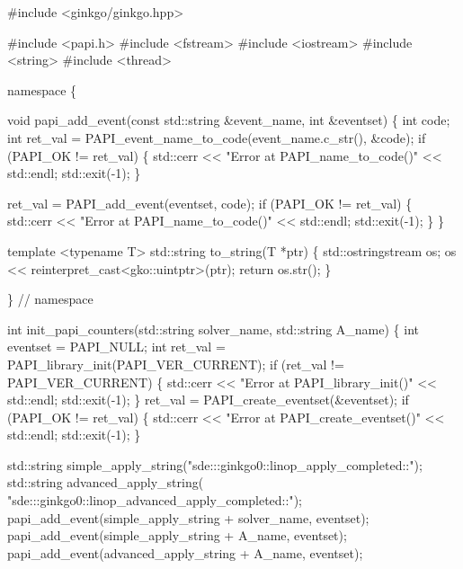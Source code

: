\begin{DoxyCodeInclude}
\textcolor{preprocessor}{#include <ginkgo/ginkgo.hpp>}


\textcolor{preprocessor}{#include <papi.h>}
\textcolor{preprocessor}{#include <fstream>}
\textcolor{preprocessor}{#include <iostream>}
\textcolor{preprocessor}{#include <string>}
\textcolor{preprocessor}{#include <thread>}


\textcolor{keyword}{namespace }\{


\textcolor{keywordtype}{void} papi\_add\_event(\textcolor{keyword}{const} std::string &event\_name, \textcolor{keywordtype}{int} &eventset)
\{
    \textcolor{keywordtype}{int} code;
    \textcolor{keywordtype}{int} ret\_val = PAPI\_event\_name\_to\_code(event\_name.c\_str(), &code);
    \textcolor{keywordflow}{if} (PAPI\_OK != ret\_val) \{
        std::cerr << \textcolor{stringliteral}{"Error at PAPI\_name\_to\_code()"} << std::endl;
        std::exit(-1);
    \}

    ret\_val = PAPI\_add\_event(eventset, code);
    \textcolor{keywordflow}{if} (PAPI\_OK != ret\_val) \{
        std::cerr << \textcolor{stringliteral}{"Error at PAPI\_name\_to\_code()"} << std::endl;
        std::exit(-1);
    \}
\}


\textcolor{keyword}{template} <\textcolor{keyword}{typename} T>
std::string to\_string(T *ptr)
\{
    std::ostringstream os;
    os << reinterpret\_cast<gko::uintptr>(ptr);
    \textcolor{keywordflow}{return} os.str();
\}


\}  \textcolor{comment}{// namespace}


\textcolor{keywordtype}{int} init\_papi\_counters(std::string solver\_name, std::string A\_name)
\{
    \textcolor{keywordtype}{int} eventset = PAPI\_NULL;
    \textcolor{keywordtype}{int} ret\_val = PAPI\_library\_init(PAPI\_VER\_CURRENT);
    \textcolor{keywordflow}{if} (ret\_val != PAPI\_VER\_CURRENT) \{
        std::cerr << \textcolor{stringliteral}{"Error at PAPI\_library\_init()"} << std::endl;
        std::exit(-1);
    \}
    ret\_val = PAPI\_create\_eventset(&eventset);
    \textcolor{keywordflow}{if} (PAPI\_OK != ret\_val) \{
        std::cerr << \textcolor{stringliteral}{"Error at PAPI\_create\_eventset()"} << std::endl;
        std::exit(-1);
    \}

    std::string simple\_apply\_string(\textcolor{stringliteral}{"sde:::ginkgo0::linop\_apply\_completed::"});
    std::string advanced\_apply\_string(
        \textcolor{stringliteral}{"sde:::ginkgo0::linop\_advanced\_apply\_completed::"});
    papi\_add\_event(simple\_apply\_string + solver\_name, eventset);
    papi\_add\_event(simple\_apply\_string + A\_name, eventset);
    papi\_add\_event(advanced\_apply\_string + A\_name, eventset);


\end{DoxyCodeInclude}
